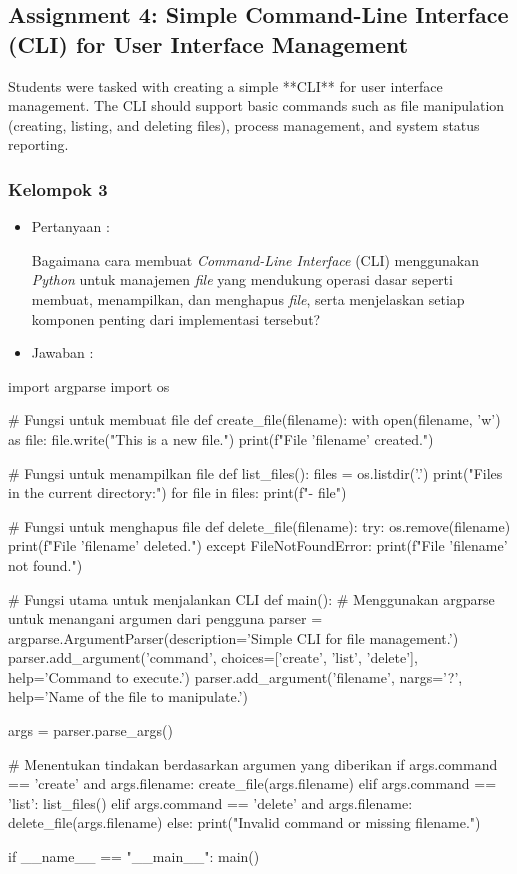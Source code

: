 \documentclass[12pt]{article}
\begin{document}
\subsection{Assignment 4: Simple Command-Line Interface (CLI) for User Interface Management}
Students were tasked with creating a simple **CLI** for user interface management. The CLI should support basic commands such as file manipulation (creating, listing, and deleting files), process management, and system status reporting.
\subsubsection{Kelompok 3}

\begin{itemize}
    \item Pertanyaan :
    
    Bagaimana cara membuat \textit{Command-Line Interface} (CLI) menggunakan \textit{Python} untuk manajemen \textit{file} yang mendukung operasi dasar seperti membuat, menampilkan, dan menghapus \textit{file}, serta menjelaskan setiap komponen penting dari implementasi tersebut?
\end{itemize}
\begin{itemize}
    \item Jawaban :
\end{itemize}
\begin{python}
import argparse
import os

# Fungsi untuk membuat file
def create_file(filename):
    with open(filename, 'w') as file:
        file.write("This is a new file.")
    print(f"File '{filename}' created.")

# Fungsi untuk menampilkan file
def list_files():
    files = os.listdir('.')
    print("Files in the current directory:")
    for file in files:
        print(f"- {file}")

# Fungsi untuk menghapus file
def delete_file(filename):
    try:
        os.remove(filename)
        print(f"File '{filename}' deleted.")
    except FileNotFoundError:
        print(f"File '{filename}' not found.")

# Fungsi utama untuk menjalankan CLI
def main():
    # Menggunakan argparse untuk menangani argumen dari pengguna
    parser = argparse.ArgumentParser(description='Simple CLI for file management.')
    parser.add_argument('command', choices=['create', 'list', 'delete'], help='Command to execute.')
    parser.add_argument('filename', nargs='?', help='Name of the file to manipulate.')

    args = parser.parse_args()

    # Menentukan tindakan berdasarkan argumen yang diberikan
    if args.command == 'create' and args.filename:
        create_file(args.filename)
    elif args.command == 'list':
        list_files()
    elif args.command == 'delete' and args.filename:
        delete_file(args.filename)
    else:
        print("Invalid command or missing filename.")

if __name__ == "__main__":
    main()
\end{python}
\end{document}
